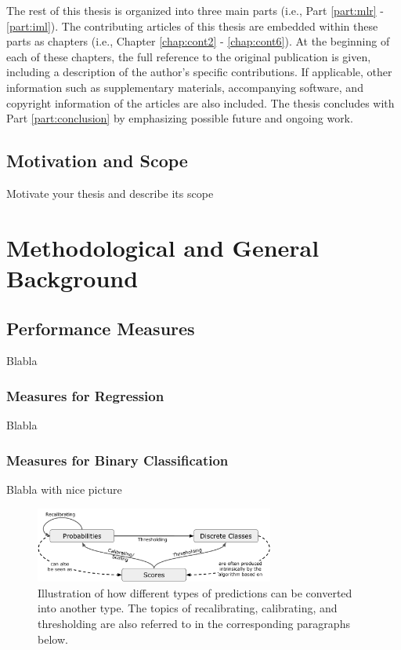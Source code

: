 \documentclass[bibliography=totoc,11pt,BCOR=12mm,DIV=14,twoside,parskip=half,paper=A4,pagesize=auto]{scrbook}\usepackage[]{graphicx}\usepackage{xcolor}
\begin{document}
The rest of this thesis is organized into three main parts (i.e., Part \ref{part:mlr} - \ref{part:iml}).
The contributing articles of this thesis are embedded within these parts as chapters (i.e., Chapter \ref{chap:cont2} - \ref{chap:cont6}).
At the beginning of each of these chapters, the full reference to the original publication is given, including a description of the author's specific contributions.
If applicable, other information such as supplementary materials, accompanying software, and copyright information of the articles are also included.
The thesis concludes with Part \ref{part:conclusion} by emphasizing possible future and ongoing work.

\section{Motivation and Scope}

Motivate your thesis and describe its scope




\chapter{Methodological and General Background}
\label{chap:background}




\section{Performance Measures}
\label{sec:perfmeasures}

Blabla

\subsection{Measures for Regression}

Blabla

\subsection{Measures for Binary Classification}
\label{sec:binclass}

Blabla with nice picture

\begin{figure}[!htb]
\centering
\includegraphics[width=0.7\textwidth]{figures/classifier-predictions_large.pdf}
\caption{Illustration of how different types of predictions can be converted into another type. The topics of recalibrating, calibrating, and thresholding are also referred to in the corresponding paragraphs below.}\label{fig:classifpred}
\end{figure}
\end{document}
